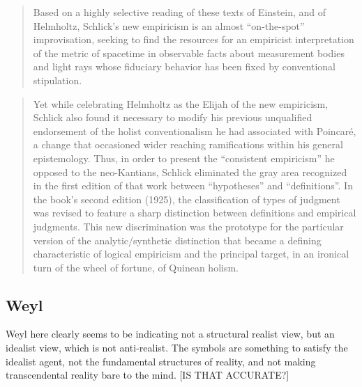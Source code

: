 \begin{quote}
    Based on a highly selective reading of these texts of Einstein, and of Helmholtz, Schlick's new empiricism is an almost ``on-the-spot'' improvisation, seeking to find the resources for an empiricist interpretation of the metric of spacetime in observable facts about measurement bodies and light rays whose fiduciary behavior has been fixed by conventional stipulation.
    
    \citep[p. 52]{Ryckman2005}
\end{quote}

\begin{quote}
    Yet while celebrating Helmholtz as the Elijah of the new empiricism, Schlick also found it necessary to modify his previous unqualified endorsement of the holist conventionalism he had associated with Poincar\'e, a change that occasioned wider reaching ramifications within his general epistemology.  Thus, in order to present the ``consistent empiricism'' he opposed to the neo-Kantians, Schlick eliminated the gray area recognized in the first edition of that work between ``hypotheses'' and ``definitions''.  In the book's second edition (1925), the classification of types of judgment was revised to feature a sharp distinction between definitions and empirical judgments.  This new discrimination was the prototype for the particular version of the analytic/synthetic distinction that became a defining characteristic of logical empiricism and the principal target, in an ironical turn of the wheel of fortune, of Quinean holism.
    
    \citep[p. 52-53]{Ryckman2005}
\end{quote}


\subsection{Weyl}

Weyl here clearly seems to be indicating not a structural realist view, but an idealist view, which is not anti-realist.  The symbols are something to satisfy the idealist agent, not the fundamental structures of reality, and not making transcendental reality bare to the mind.  [IS THAT ACCURATE?]

